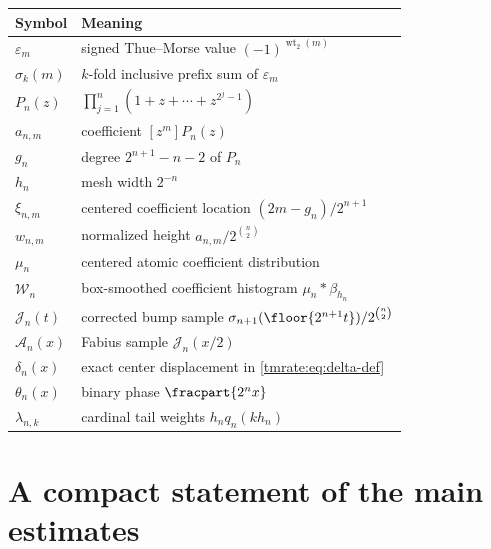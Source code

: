 \documentclass[11pt,oneside]{article}
\theoremstyle{definition}
\theoremstyle{remark}
\newcommand{\wt}{\operatorname{wt}_2}
\begin{document}
\begin{center}
\begin{tabularx}{0.96\textwidth}{@{}l>{\raggedright\arraybackslash}X@{}}
\toprule
Symbol & Meaning\\
\midrule
$\varepsilon_m$ & signed Thue--Morse value $(-1)^{\wt(m)}$\\
$\sigma_k(m)$ & $k$-fold inclusive prefix sum of $\varepsilon_m$\\
$P_n(z)$ & $\prod_{j=1}^n(1+z+\cdots+z^{2^j-1})$\\
$a_{n,m}$ & coefficient $[z^m]P_n(z)$\\
$g_n$ & degree $2^{n+1}-n-2$ of $P_n$\\
$h_n$ & mesh width $2^{-n}$\\
$\xi_{n,m}$ & centered coefficient location $(2m-g_n)/2^{n+1}$\\
$w_{n,m}$ & normalized height $a_{n,m}/2^{\binom n2}$\\
$\mu_n$ & centered atomic coefficient distribution\\
$\mathcal W_n$ & box-smoothed coefficient histogram $\mu_n*\beta_{h_n}$\\
$\mathcal J_n(t)$ & corrected bump sample $\sigma_{n+1}(\floor{2^{n+1}t})/2^{\binom n2}$\\
$\mathcal A_n(x)$ & Fabius sample $\mathcal J_n(x/2)$\\
$\delta_n(x)$ & exact center displacement in \eqref{tmrate:eq:delta-def}\\
$\theta_n(x)$ & binary phase $\fracpart{2^n x}$\\
$\lambda_{n,k}$ & cardinal tail weights $h_nq_n(kh_n)$\\
\bottomrule
\end{tabularx}
\end{center}

\section{A compact statement of the main estimates}
\label{tmrate:app:summary}
\end{document}
